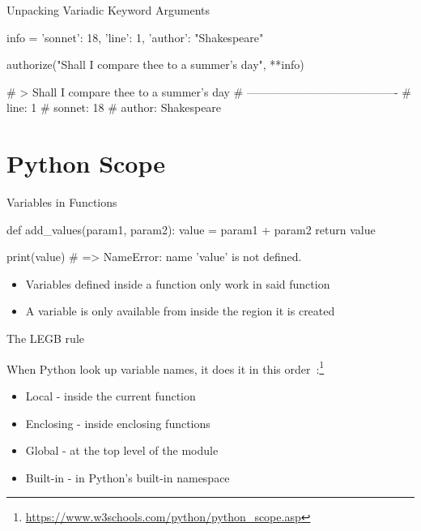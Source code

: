 \documentclass[serif, aspectratio=169]{beamer}
\begin{document}
\begin{frame}[fragile]{Unpacking Variadic Keyword Arguments}
    \begin{pythoncode}
    info = {
        'sonnet': 18,
        'line': 1,
        'author': "Shakespeare"
    }

    authorize("Shall I compare thee to a summer's day", **info)

    # > Shall I compare thee to a summer's day
    # ----------------------------------------
    # line: 1
    # sonnet: 18
    # author: Shakespeare
    \end{pythoncode}
\end{frame}

\section{Python Scope}

\begin{frame}[fragile]{Variables in Functions}
    \begin{pythoncode}
    def add_values(param1, param2):
        value = param1 + param2
        return value

    print(value) # => NameError: name 'value' is not defined.
    \end{pythoncode}
    \pause
    \begin{block}{}
        \begin{itemize}
            \item Variables defined inside a function only work in said function
            \item A variable is only available from inside the region it is created
        \end{itemize}
    \end{block}
\end{frame}

\begin{frame}{The LEGB rule}
    \begin{block}{When Python look up variable names, it does it in this order~:\footnote{\url{https://www.w3schools.com/python/python_scope.asp}}}
        \begin{itemize}
            \item[1.] Local - inside the current function
            \item[2.] Enclosing - inside enclosing functions
            \item[3.] Global - at the top level of the module
            \item[4.] Built-in - in Python's built-in namespace
        \end{itemize}
    \end{block}
\end{frame}
\end{document}
